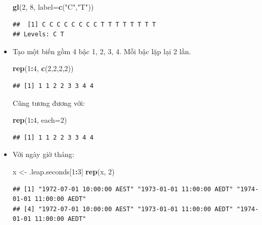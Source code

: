 \documentclass[
]{book}
\newenvironment{Shaded}{\begin{snugshade}}{\end{snugshade}}
\newcommand{\DataTypeTok}[1]{\textcolor[rgb]{0.13,0.29,0.53}{#1}}
\newcommand{\DecValTok}[1]{\textcolor[rgb]{0.00,0.00,0.81}{#1}}
\newcommand{\KeywordTok}[1]{\textcolor[rgb]{0.13,0.29,0.53}{\textbf{#1}}}
\newcommand{\NormalTok}[1]{#1}
\newcommand{\OperatorTok}[1]{\textcolor[rgb]{0.81,0.36,0.00}{\textbf{#1}}}
\newcommand{\StringTok}[1]{\textcolor[rgb]{0.31,0.60,0.02}{#1}}
\begin{document}
\begin{itemize}
\begin{Shaded}
\begin{Highlighting}[]
\KeywordTok{gl}\NormalTok{(}\DecValTok{2}\NormalTok{, }\DecValTok{8}\NormalTok{, }\DataTypeTok{label=}\KeywordTok{c}\NormalTok{(}\StringTok{"C"}\NormalTok{,}\StringTok{"T"}\NormalTok{))}
\end{Highlighting}
\end{Shaded}

\begin{verbatim}
##  [1] C C C C C C C C T T T T T T T T
## Levels: C T
\end{verbatim}
\item
  Tạo một biến gồm 4 bậc 1, 2, 3, 4. Mỗi bậc lặp lại 2 lần.

\begin{Shaded}
\begin{Highlighting}[]
\KeywordTok{rep}\NormalTok{(}\DecValTok{1}\OperatorTok{:}\DecValTok{4}\NormalTok{, }\KeywordTok{c}\NormalTok{(}\DecValTok{2}\NormalTok{,}\DecValTok{2}\NormalTok{,}\DecValTok{2}\NormalTok{,}\DecValTok{2}\NormalTok{))}
\end{Highlighting}
\end{Shaded}

\begin{verbatim}
## [1] 1 1 2 2 3 3 4 4
\end{verbatim}

  Cũng tương đương với:

\begin{Shaded}
\begin{Highlighting}[]
\KeywordTok{rep}\NormalTok{(}\DecValTok{1}\OperatorTok{:}\DecValTok{4}\NormalTok{, }\DataTypeTok{each=}\DecValTok{2}\NormalTok{)}
\end{Highlighting}
\end{Shaded}

\begin{verbatim}
## [1] 1 1 2 2 3 3 4 4
\end{verbatim}
\item
  Với ngày giờ tháng:

\begin{Shaded}
\begin{Highlighting}[]
\NormalTok{x \textless{}{-}}\StringTok{ }\NormalTok{.leap.seconds[}\DecValTok{1}\OperatorTok{:}\DecValTok{3}\NormalTok{]}
\KeywordTok{rep}\NormalTok{(x, }\DecValTok{2}\NormalTok{)}
\end{Highlighting}
\end{Shaded}

\begin{verbatim}
## [1] "1972-07-01 10:00:00 AEST" "1973-01-01 11:00:00 AEDT" "1974-01-01 11:00:00 AEDT"
## [4] "1972-07-01 10:00:00 AEST" "1973-01-01 11:00:00 AEDT" "1974-01-01 11:00:00 AEDT"
\end{verbatim}


\end{itemize}
\end{document}
